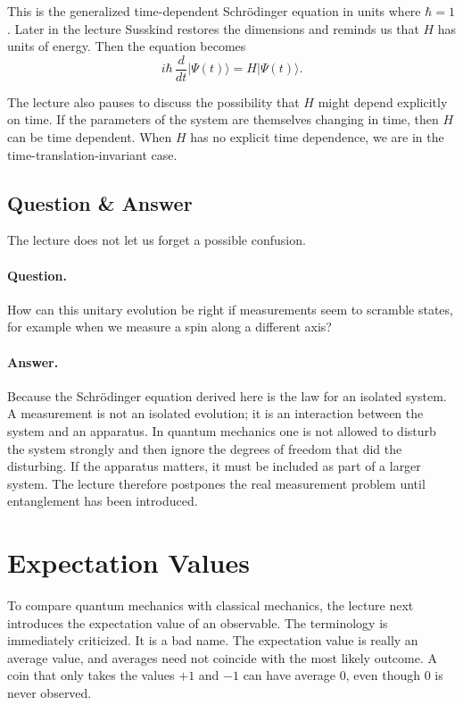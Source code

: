 This is the generalized time-dependent Schr\"odinger equation in units where \(\hbar=1\). Later in the lecture Susskind restores the dimensions and reminds us that \(H\) has units of energy. Then the equation becomes
\begin{equation}
i\hbar\,\frac{d}{dt}|\Psi(t)\rangle=H|\Psi(t)\rangle.
\end{equation}

The lecture also pauses to discuss the possibility that \(H\) might depend explicitly on time. If the parameters of the system are themselves changing in time, then \(H\) can be time dependent. When \(H\) has no explicit time dependence, we are in the time-translation-invariant case.

\subsection{Question \& Answer}

The lecture does not let us forget a possible confusion.

\paragraph{Question.} How can this unitary evolution be right if measurements seem to scramble states, for example when we measure a spin along a different axis?

\paragraph{Answer.} Because the Schr\"odinger equation derived here is the law for an isolated system. A measurement is not an isolated evolution; it is an interaction between the system and an apparatus. In quantum mechanics one is not allowed to disturb the system strongly and then ignore the degrees of freedom that did the disturbing. If the apparatus matters, it must be included as part of a larger system. The lecture therefore postpones the real measurement problem until entanglement has been introduced.

\section{Expectation Values}

To compare quantum mechanics with classical mechanics, the lecture next introduces the expectation value of an observable. The terminology is immediately criticized. It is a bad name. The expectation value is really an average value, and averages need not coincide with the most likely outcome. A coin that only takes the values \(+1\) and \(-1\) can have average \(0\), even though \(0\) is never observed.

